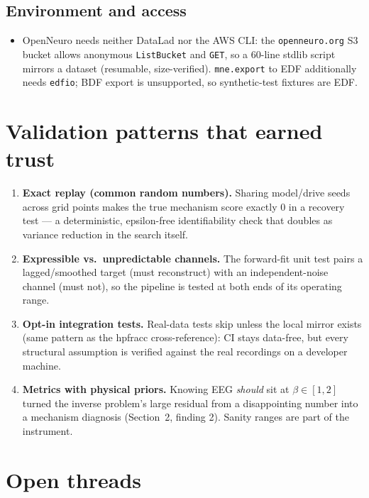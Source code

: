 \documentclass[11pt]{article}
\begin{document}
\subsection{Environment and access}

\begin{itemize}[leftmargin=1.6em]
  \item OpenNeuro needs neither DataLad nor the AWS CLI: the
        \texttt{openneuro.org} S3 bucket allows anonymous \texttt{ListBucket}
        and \texttt{GET}, so a 60-line stdlib script mirrors a dataset
        (resumable, size-verified). \texttt{mne.export} to EDF additionally
        needs \texttt{edfio}; BDF export is unsupported, so synthetic-test
        fixtures are EDF.
\end{itemize}

\section{Validation patterns that earned trust}

\begin{enumerate}[leftmargin=1.6em]
  \item \textbf{Exact replay (common random numbers).} Sharing model/drive
        seeds across grid points makes the true mechanism score exactly $0$
        in a recovery test --- a deterministic, epsilon-free identifiability
        check that doubles as variance reduction in the search itself.
  \item \textbf{Expressible vs.\ unpredictable channels.} The forward-fit
        unit test pairs a lagged/smoothed target (must reconstruct) with an
        independent-noise channel (must not), so the pipeline is tested at
        both ends of its operating range.
  \item \textbf{Opt-in integration tests.} Real-data tests skip unless the
        local mirror exists (same pattern as the hpfracc cross-reference):
        CI stays data-free, but every structural assumption is verified
        against the real recordings on a developer machine.
  \item \textbf{Metrics with physical priors.} Knowing EEG \emph{should} sit
        at $\beta \in [1,2]$ turned the inverse problem's large residual from
        a disappointing number into a mechanism diagnosis (Section~2,
        finding 2). Sanity ranges are part of the instrument.
\end{enumerate}

\section{Open threads}
\end{document}
